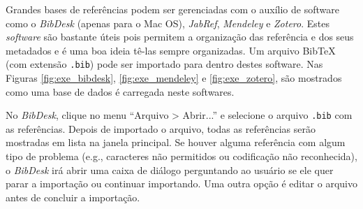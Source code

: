 Grandes bases de referências podem ser gerenciadas com o auxílio de software como o \textit{BibDesk} (apenas para o Mac OS), \textit{JabRef}, \textit{Mendeley} e \textit{Zotero}. Estes \textit{software} são bastante úteis pois permitem a organização das referência e dos seus metadados e é uma boa ideia tê-las sempre organizadas. Um arquivo Bib\TeX{} (com extensão {\tt .bib}) pode ser importado para dentro destes software. Nas Figuras \ref{fig:exe_bibdesk}, \ref{fig:exe_mendeley} e \ref{fig:exe_zotero}, são mostrados como uma base de dados é carregada neste softwares.

No \textit{BibDesk}, clique no menu ``Arquivo > Abrir...'' e selecione o arquivo {\tt .bib} com as referências. Depois de importado o arquivo, todas as referências serão mostradas em lista na janela principal. Se houver alguma referência com algum tipo de problema (e.g., caracteres não permitidos ou codificação não reconhecida), o \textit{BibDesk} irá abrir uma caixa de diálogo perguntando ao usuário se ele quer parar a importação ou continuar importando. Uma outra opção é editar o arquivo antes de concluir a importação.

%

